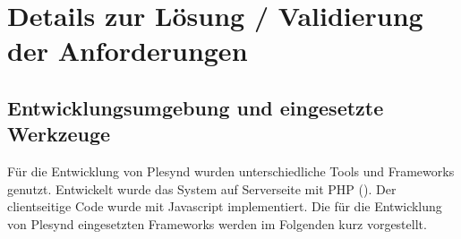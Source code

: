 \chapter{Details zur Lösung / Validierung der Anforderungen}\label{chapter:Kapitel6}

\section{Entwicklungsumgebung und eingesetzte Werkzeuge}\label{section:entwicklungsumgebungen_tools}
Für die Entwicklung von Plesynd wurden unterschiedliche Tools und Frameworks genutzt. Entwickelt wurde das System auf Serverseite mit \acs{PHP} (). Der clientseitige Code wurde mit Javascript implementiert. Die für die Entwicklung von Plesynd eingesetzten Frameworks werden im Folgenden kurz vorgestellt.

